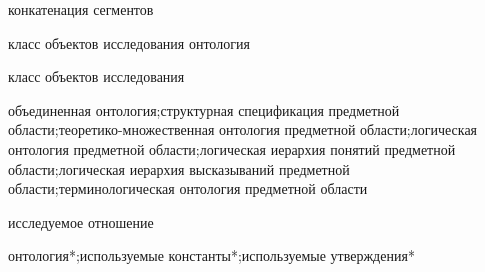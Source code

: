 \begin{SCn}
\scnsectionheader{\currentname}
\begin{scnsubstruct}
\begin{scnreltovector}{конкатенация сегментов}


\end{scnreltovector}
\begin{scnhaselementrole}{класс объектов исследования} онтология
\end{scnhaselementrole}
\begin{scnhaselementrolelist}{класс объектов исследования}

объединенная онтология;структурная спецификация предметной области;теоретико-множественная онтология предметной области;логическая онтология предметной области;логическая иерархия понятий предметной области;логическая иерархия высказываний предметной области;терминологическая онтология предметной области

\end{scnhaselementrolelist}
\begin{scnhaselementrolelist}{исследуемое отношение}

онтология*;используемые константы*;используемые утверждения*


\end{scnhaselementrolelist}
\end{scnsubstruct}
\end{SCn}
